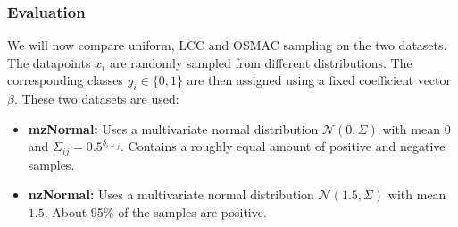 \subsubsection{Evaluation}%
\label{sec:params:osmac:eval}

We will now compare uniform, LCC and OSMAC sampling on the two datasets.
The datapoints \(x_i\) are randomly sampled from different distributions.
The corresponding classes \(y_i \in \{0, 1\}\) are then assigned using a fixed coefficient vector \(\beta\).
These two datasets are used:
\begin{itemize}
	\item \textbf{mzNormal:}
		Uses a multivariate normal distribution \(\mathcal{N}(0, \Sigma)\) with mean \(0\) and \(\Sigma_{i j} = 0.5^{\delta_{i \neq j}}\).
		Contains a roughly equal amount of positive and negative samples.
	\item \textbf{nzNormal:}
		Uses a multivariate normal distribution \(\mathcal{N}(1.5, \Sigma)\) with mean \(1.5\).
		About 95\% of the samples are positive.
\end{itemize}

